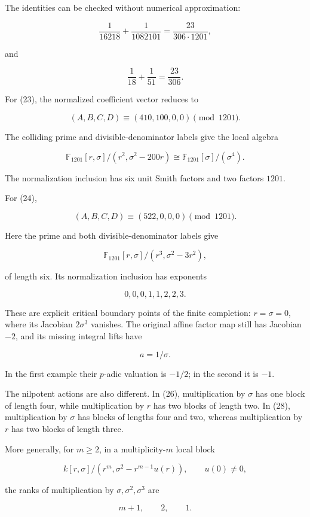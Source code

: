 The identities can be checked without numerical approximation:

\[
\frac1{16218}+\frac1{1082101}
=\frac{23}{306\cdot1201},
\]

and

\[
\frac1{18}+\frac1{51}=\frac{23}{306}.
\]

For (23), the normalized coefficient vector reduces to

\[
\boxed{(A,B,C,D)\equiv(410,100,0,0)\pmod{1201}.}
\tag{25}
\]

The colliding prime and divisible-denominator labels give the local
algebra

\[
\boxed{
\mathbb F_{1201}[r,\sigma]/(r^2,\sigma^2-200r)
\cong\mathbb F_{1201}[\sigma]/(\sigma^4).
}
\tag{26}
\]

The normalization inclusion has six unit Smith factors and two factors
\(1201\).

For (24),

\[
\boxed{(A,B,C,D)\equiv(522,0,0,0)\pmod{1201}.}
\tag{27}
\]

Here the prime and both divisible-denominator labels give

\[
\boxed{
\mathbb F_{1201}[r,\sigma]/(r^3,\sigma^2-3r^2),
}
\tag{28}
\]

of length six. Its normalization inclusion has exponents

\[
0,0,0,1,1,2,2,3.
\]

These are explicit critical boundary points of the finite completion:
\(r=\sigma=0\), where its Jacobian \(2\sigma^3\) vanishes. The original
affine factor map still has Jacobian \(-2\), and its missing integral
lifts have

\[
a=1/\sigma.
\]

In the first example their \(p\)-adic valuation is \(-1/2\); in the
second it is \(-1\).

The nilpotent actions are also different. In (26), multiplication by
\(\sigma\) has one block of length four, while multiplication by \(r\)
has two blocks of length two. In (28), multiplication by \(\sigma\) has
blocks of lengths four and two, whereas multiplication by \(r\) has two
blocks of length three.

More generally, for \(m\ge2\), in a multiplicity-\(m\) local block

\[
k[r,\sigma]/(r^m,\sigma^2-r^{m-1}u(r)),
\qquad u(0)\ne0,
\]

the ranks of multiplication by \(\sigma,\sigma^2,\sigma^3\) are

\[
m+1,\qquad2,\qquad1.
\]

